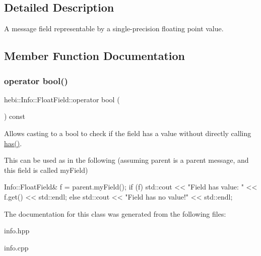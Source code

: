 \subsection{Detailed Description}
A message field representable by a single-\/precision floating point value. 

\subsection{Member Function Documentation}
\mbox{\label{classhebi_1_1Info_1_1FloatField_addb566585d4c83cc9cf16dc511cc1321}} 
\subsubsection{\texorpdfstring{operator bool()}{operator bool()}}
{\footnotesize\ttfamily hebi\+::\+Info\+::\+Float\+Field\+::operator bool (\begin{DoxyParamCaption}{ }\end{DoxyParamCaption}) const\hspace{0.3cm}{\ttfamily [explicit]}}



Allows casting to a bool to check if the field has a value without directly calling {\ttfamily \hyperlink{classhebi_1_1Info_1_1FloatField_a02808f458244bf363e6cdea1f30aaf9d}{has()}}. 

This can be used as in the following (assuming \textquotesingle{}parent\textquotesingle{} is a parent message, and this field is called \textquotesingle{}my\+Field\textquotesingle{}) 
\begin{DoxyCode}
Info::FloatField& f = parent.myField();
\textcolor{keywordflow}{if} (f)
  std::cout << \textcolor{stringliteral}{"Field has value: "} << f.get() << std::endl;
\textcolor{keywordflow}{else}
  std::cout << \textcolor{stringliteral}{"Field has no value!"} << std::endl;
\end{DoxyCode}
 

The documentation for this class was generated from the following files\+:\begin{DoxyCompactItemize}
\item 
info.\+hpp\item 
info.\+cpp\end{DoxyCompactItemize}
